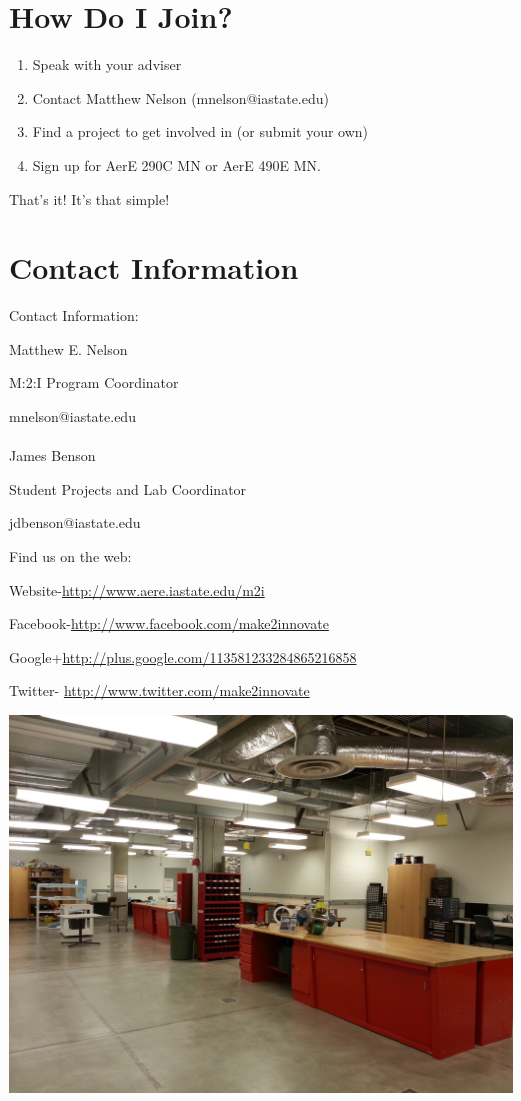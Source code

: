 \documentclass[10pt,foldmark,notumble]{leaflet}
\begin{document}
\section{How Do I Join?}

\begin{enumerate}
\item Speak with your adviser
\item Contact Matthew Nelson (mnelson@iastate.edu)
\item Find a project to get involved in (or submit your own)
\item Sign up for AerE 290C MN or AerE 490E MN.
\end{enumerate}

That's it!  It's that simple!

\section{Contact Information}

\begin{center}
Contact Information:

Matthew E. Nelson

M:2:I Program Coordinator

mnelson@iastate.edu
\ \\ \ \\
James Benson

Student Projects and Lab Coordinator

jdbenson@iastate.edu
\end{center}

Find us on the web:

Website-\url{http://www.aere.iastate.edu/m2i}

Facebook-\url{http://www.facebook.com/make2innovate}

Google+\url{http://plus.google.com/113581233284865216858}

Twitter- \url{http://www.twitter.com/make2innovate}

\includegraphics[scale=.07]{images/0620_lab.jpg}
\end{document}
